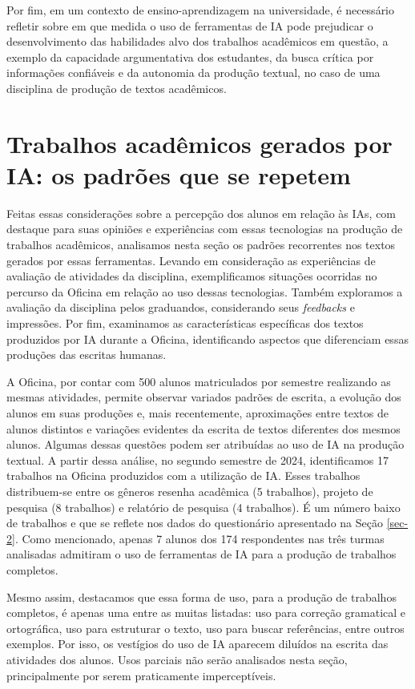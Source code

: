 \documentclass[portuguese]{textolivre}
\begin{document}
Por fim, em um contexto de ensino-aprendizagem na universidade, é necessário refletir sobre em que medida o uso de ferramentas de IA pode prejudicar o desenvolvimento das habilidades alvo dos trabalhos acadêmicos em questão, a exemplo da capacidade argumentativa dos estudantes, da busca crítica por informações confiáveis e da autonomia da produção textual, no caso de uma disciplina de produção de textos acadêmicos.

\section{Trabalhos acadêmicos gerados por IA: os padrões que se repetem
}\label{sec-3}
Feitas essas considerações sobre a percepção dos alunos em relação às IAs, com destaque para suas opiniões e experiências com essas tecnologias na produção de trabalhos acadêmicos, analisamos nesta seção os padrões recorrentes nos textos gerados por essas ferramentas. Levando em consideração as experiências de avaliação de atividades da disciplina, exemplificamos situações ocorridas no percurso da Oficina em relação ao uso dessas tecnologias. Também exploramos a avaliação da disciplina pelos graduandos, considerando seus \textit{feedbacks} e impressões. Por fim, examinamos as características específicas dos textos produzidos por IA durante a Oficina, identificando aspectos que diferenciam essas produções das escritas humanas.

A Oficina, por contar com 500 alunos matriculados por semestre realizando as mesmas atividades, permite observar variados padrões de escrita, a evolução dos alunos em suas produções e, mais recentemente, aproximações entre textos de alunos distintos e variações evidentes da escrita de textos diferentes dos mesmos alunos. Algumas dessas questões podem ser atribuídas ao uso de IA na produção textual. A partir dessa análise, no segundo semestre de 2024, identificamos 17 trabalhos na Oficina produzidos com a utilização de IA. Esses trabalhos distribuem-se entre os gêneros resenha acadêmica (5 trabalhos), projeto de pesquisa (8 trabalhos) e relatório de pesquisa (4 trabalhos). É um número baixo de trabalhos e que se reflete nos dados do questionário apresentado na Seção \ref{sec-2}. Como mencionado, apenas 7 alunos dos 174 respondentes nas três turmas analisadas admitiram o uso de ferramentas de IA para a produção de trabalhos completos.

Mesmo assim, destacamos que essa forma de uso, para a produção de trabalhos completos, é apenas uma entre as muitas listadas: uso para correção gramatical e ortográfica, uso para estruturar o texto, uso para buscar referências, entre outros exemplos. Por isso, os vestígios do uso de IA aparecem diluídos na escrita das atividades dos alunos. Usos parciais não serão analisados nesta seção, principalmente por serem praticamente imperceptíveis.
\end{document}
